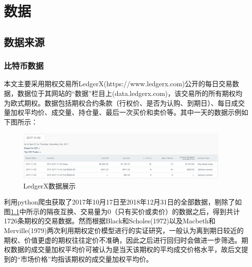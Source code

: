 \chapter{数据}
\section{数据来源}
\subsection{比特币数据}
\par{
    
    本文主要采用期权交易所LedgerX(https://www.ledgerx.com)公开的每日交易数据，数据位于其网站的“数据”栏目上(data.ledgerx.com)，该交易所的所有期权均为欧式期权。数据包括期权合约条款（行权价、是否为认购、到期日）、每日成交量加权平均价、成交量、持仓量、最后一次买价和卖价等。其中一天的数据示例如下图所示：
    \begin{figure}[H]
        \begin{small}
            \begin{center}
                \includegraphics[width=0.95\textwidth]{figures/data_example.png}
            \end{center}
            \caption{LedgerX数据展示}
            \label{data_example}
        \end{small}
    \end{figure}
    利用python爬虫获取了2017年10月17日至2018年12月31日的全部数据，剔除了如图\ref{data_example}中所示的隔夜互换、交易量为0（只有买价或卖价）的数据之后，得到共计1726条期权的交易数据。然而根据Black和Scholes(1972)\cite{J-1972}以及Macbeth和Merville(1979)\cite{Jame-1979}两次利用期权定价模型进行的实证研究，一般认为离到期日较近的期权、价值更虚的期权往往定价不准确，因此之后进行回归时会做进一步筛选。期权数据的成交量加权平均价可被认为是当天该期权的平均成交价格水平，故后文提到的“市场价格”均指该期权的成交量加权平均价。
}
